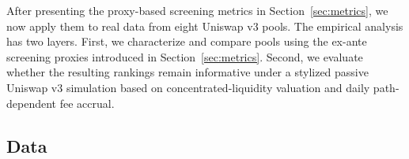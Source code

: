 \documentclass[anonymous]{lipics-v2021}
\begin{document}
{After presenting the proxy-based screening metrics in Section~\ref{sec:metrics}, we now apply them to real data from eight Uniswap v3 pools. The empirical analysis has two layers. First, we characterize and compare pools using the ex-ante screening proxies introduced in Section~\ref{sec:metrics}. Second, we evaluate whether the resulting rankings remain informative under a stylized passive Uniswap v3 simulation based on concentrated-liquidity valuation and daily path-dependent fee accrual.


\subsection{Data}



}
\end{document}
